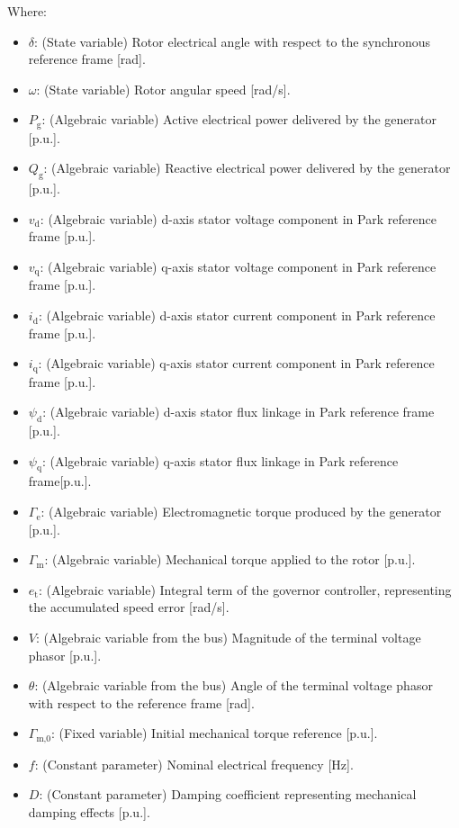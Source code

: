 \begin{itemize}
Where:
\begin{itemize}
  \item $\delta$: (State variable) Rotor electrical angle with respect to the synchronous reference frame [rad].
  \item $\omega$: (State variable) Rotor angular speed [rad/s].
  \item $P_\text{g}$: (Algebraic variable) Active electrical power delivered by the generator [p.u.].
  \item $Q_\text{g}$: (Algebraic variable) Reactive electrical power delivered by the generator [p.u.].
  \item $v_\text{d}$: (Algebraic variable) d-axis stator voltage component in Park reference frame [p.u.].
  \item $v_\text{q}$: (Algebraic variable) q-axis stator voltage component in Park reference frame [p.u.].
  \item $i_\text{d}$: (Algebraic variable) d-axis stator current component in Park reference frame [p.u.].
  \item $i_\text{q}$: (Algebraic variable) q-axis stator current component in Park reference frame [p.u.].
  \item $\psi_\text{d}$: (Algebraic variable) d-axis stator flux linkage in Park reference frame [p.u.].
  \item $\psi_\text{q}$: (Algebraic variable) q-axis stator flux linkage in Park reference frame[p.u.].
  \item $\Gamma_\text{e}$: (Algebraic variable) Electromagnetic torque produced by the generator [p.u.].
  \item $\Gamma_\text{m}$: (Algebraic variable) Mechanical torque applied to the rotor [p.u.].
  \item $e_\text{t}$: (Algebraic variable) Integral term of the governor controller, representing the accumulated speed error [rad/s].
  \item $V$: (Algebraic variable from the bus) Magnitude of the terminal voltage phasor [p.u.].
  \item $\theta$: (Algebraic variable from the bus) Angle of the terminal voltage phasor with respect to the reference frame [rad].
  \item $\Gamma_{\text{m,0}}$: (Fixed variable) Initial mechanical torque reference [p.u.].
  \item $f$: (Constant parameter) Nominal electrical frequency [Hz].
  \item $D$: (Constant parameter) Damping coefficient representing mechanical damping effects [p.u.].

\end{itemize}
\end{itemize}
